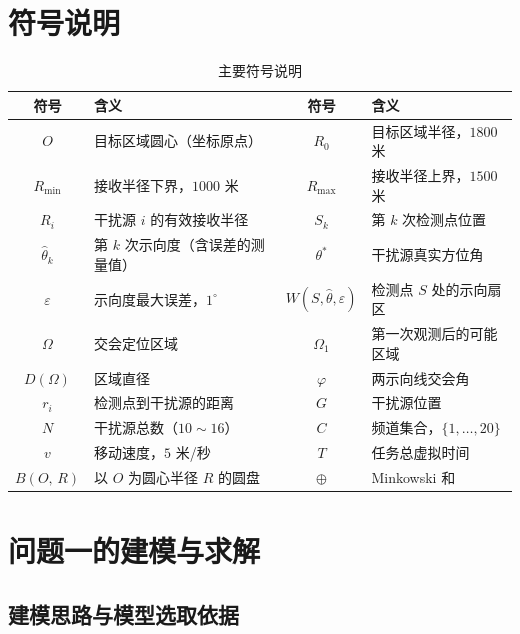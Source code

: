 \documentclass[12pt,a4paper]{ctexart}
\numberwithin{figure}{section}
\numberwithin{table}{section}
\numberwithin{equation}{section}
\newcommand{\disk}[2]{B\!\left(#1,\,#2\right)}
\begin{document}
\section{符号说明}

\begin{table}[H]
\centering
\caption{主要符号说明}
\label{tab:symbols}
\begin{tabular}{clcl}
\toprule
符号 & 含义 & 符号 & 含义 \\
\midrule
$O$ & 目标区域圆心（坐标原点） & $R_0$ & 目标区域半径，$1800$ 米 \\
$R_{\min}$ & 接收半径下界，$1000$ 米 & $R_{\max}$ & 接收半径上界，$1500$ 米 \\
$R_i$ & 干扰源 $i$ 的有效接收半径 & $S_k$ & 第 $k$ 次检测点位置 \\
$\hat{\theta}_k$ & 第 $k$ 次示向度（含误差的测量值） & $\theta^*$ & 干扰源真实方位角 \\
$\varepsilon$ & 示向度最大误差，$1^{\circ}$ & $W(S,\hat{\theta},\varepsilon)$ & 检测点 $S$ 处的示向扇区 \\
$\Omega$ & 交会定位区域 & $\Omega_1$ & 第一次观测后的可能区域 \\
$D(\Omega)$ & 区域直径 & $\varphi$ & 两示向线交会角 \\
$r_i$ & 检测点到干扰源的距离 & $G$ & 干扰源位置 \\
$N$ & 干扰源总数（$10\sim16$） & $C$ & 频道集合，$\{1,\dots,20\}$ \\
$v$ & 移动速度，$5$ 米/秒 & $T$ & 任务总虚拟时间 \\
$\disk{O}{R}$ & 以 $O$ 为圆心半径 $R$ 的圆盘 & $\oplus$ & Minkowski 和 \\
\bottomrule
\end{tabular}
\end{table}

\section{问题一的建模与求解}

\subsection{建模思路与模型选取依据}
\end{document}
